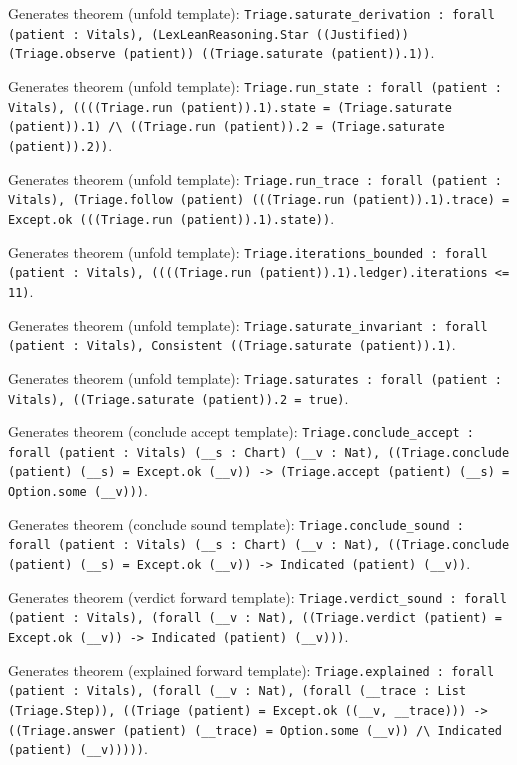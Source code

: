 \documentclass[11pt]{article}
\begin{document}
\noindent Generates theorem (unfold template): \texttt{Triage.saturate\_derivation : forall (patient : Vitals), (LexLeanReasoning.Star ((Justified)) (Triage.observe (patient)) ((Triage.saturate (patient)).1))}.\par
\noindent Generates theorem (unfold template): \texttt{Triage.run\_state : forall (patient : Vitals), ((((Triage.run (patient)).1).state = (Triage.saturate (patient)).1) /\textbackslash{} ((Triage.run (patient)).2 = (Triage.saturate (patient)).2))}.\par
\noindent Generates theorem (unfold template): \texttt{Triage.run\_trace : forall (patient : Vitals), (Triage.follow (patient) (((Triage.run (patient)).1).trace) = Except.ok (((Triage.run (patient)).1).state))}.\par
\noindent Generates theorem (unfold template): \texttt{Triage.iterations\_bounded : forall (patient : Vitals), ((((Triage.run (patient)).1).ledger).iterations <= 11)}.\par
\noindent Generates theorem (unfold template): \texttt{Triage.saturate\_invariant : forall (patient : Vitals), Consistent ((Triage.saturate (patient)).1)}.\par
\noindent Generates theorem (unfold template): \texttt{Triage.saturates : forall (patient : Vitals), ((Triage.saturate (patient)).2 = true)}.\par
\noindent Generates theorem (conclude accept template): \texttt{Triage.conclude\_accept : forall (patient : Vitals) (\_\_s : Chart) (\_\_v : Nat), ((Triage.conclude (patient) (\_\_s) = Except.ok (\_\_v)) -> (Triage.accept (patient) (\_\_s) = Option.some (\_\_v)))}.\par
\noindent Generates theorem (conclude sound template): \texttt{Triage.conclude\_sound : forall (patient : Vitals) (\_\_s : Chart) (\_\_v : Nat), ((Triage.conclude (patient) (\_\_s) = Except.ok (\_\_v)) -> Indicated (patient) (\_\_v))}.\par
\noindent Generates theorem (verdict forward template): \texttt{Triage.verdict\_sound : forall (patient : Vitals), (forall (\_\_v : Nat), ((Triage.verdict (patient) = Except.ok (\_\_v)) -> Indicated (patient) (\_\_v)))}.\par
\noindent Generates theorem (explained forward template): \texttt{Triage.explained : forall (patient : Vitals), (forall (\_\_v : Nat), (forall (\_\_trace : List (Triage.Step)), ((Triage (patient) = Except.ok ((\_\_v, \_\_trace))) -> ((Triage.answer (patient) (\_\_trace) = Option.some (\_\_v)) /\textbackslash{} Indicated (patient) (\_\_v)))))}.\par
\end{document}
